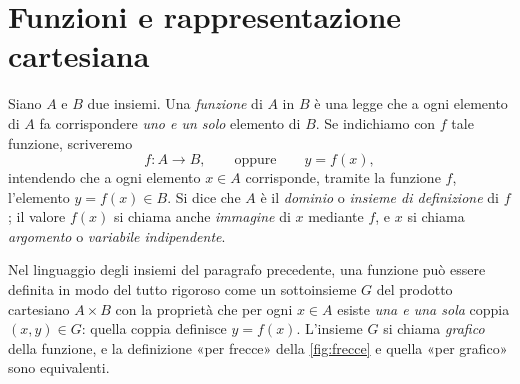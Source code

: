 \section{Funzioni e rappresentazione cartesiana}
\label{sec:funzioni}

\begin{definizione}[Funzione]
Siano $A$ e $B$ due insiemi. Una \emph{funzione} di $A$ in $B$ è una legge che a ogni
elemento di $A$ fa corrispondere \emph{uno e un solo} elemento di $B$. Se indichiamo con
$f$ tale funzione, scriveremo
\[
  f\colon A\to B, \qquad\text{oppure}\qquad y=f(x),
\]
intendendo che a ogni elemento $x\in A$ corrisponde, tramite la funzione $f$, l'elemento
$y=f(x)\in B$. Si dice che $A$ è il \emph{dominio} o \emph{insieme di definizione} di
$f$; il valore $f(x)$ si chiama anche \emph{immagine} di $x$ mediante $f$, e $x$ si
chiama \emph{argomento} o \emph{variabile indipendente}.
\end{definizione}

\begin{marginfigure}
\centering
{}
\caption{Una funzione $f\colon A\to B$: da ogni elemento di $A$ parte \emph{una sola}
freccia. Due frecce possono arrivare sullo stesso elemento di $B$, e qualche elemento di
$B$ può non essere raggiunto.}
\label{fig:frecce}
\end{marginfigure}

Nel linguaggio degli insiemi del paragrafo precedente, una funzione può essere definita
in modo del tutto rigoroso come un sottoinsieme $G$ del prodotto cartesiano $A\times B$
con la proprietà che per ogni $x\in A$ esiste \emph{una e una sola} coppia $(x,y)\in G$:
quella coppia definisce $y=f(x)$. L'insieme $G$ si chiama \emph{grafico} della
funzione, e la definizione «per frecce» della \cref{fig:frecce} e quella «per grafico»
sono equivalenti.

